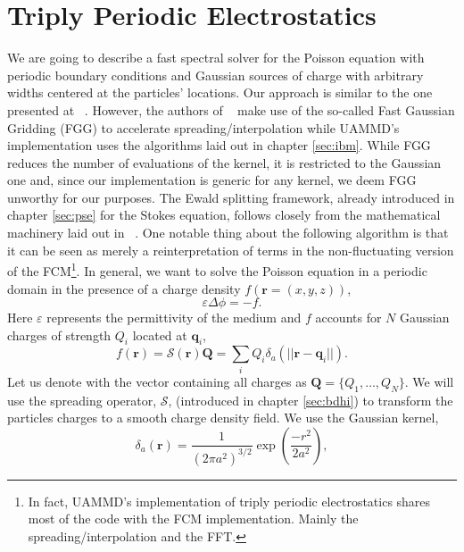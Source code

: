 \documentclass[twoside,openright,titlepage,numbers=noenddot,%
headinclude,footinclude,cleardoublepage=empty,abstract=on,
BCOR=5mm,fontsize=11pt, dvipsnames, paper=b5
]{scrreprt}
\renewcommand{\vec}[1]{\bm{#1}}
\newcommand{\oper}[1]{\mathcal{#1}}
\newcommand{\ppos}{q}
\newcommand{\fpos}{r}
\begin{document}
\chapter{Triply Periodic Electrostatics} \label{ch:tppoisson}

We are going to describe a fast spectral solver for the Poisson equation with periodic boundary conditions and Gaussian sources of charge with arbitrary widths centered at the particles' locations. Our approach is similar to the one presented at ~\cite{Lindbo2011}. However, the authors of ~\cite{Lindbo2011} make use of the so-called Fast Gaussian Gridding (FGG) to accelerate spreading/interpolation while UAMMD's implementation uses the algorithms laid out in chapter \ref{sec:ibm}. While FGG reduces the number of evaluations of the kernel, it is restricted to the Gaussian one and, since our implementation is generic for any kernel, we deem FGG unworthy for our purposes. The Ewald splitting framework, already introduced in chapter \ref{sec:pse} for the Stokes equation, follows closely from the mathematical machinery laid out in ~\cite{Tornberg2015}.
One notable thing about the following algorithm is that it can be seen as merely a reinterpretation of terms in the non-fluctuating version of the \gls{FCM}\footnote{In fact, UAMMD's implementation of triply periodic electrostatics shares most of the code with the \gls{FCM} implementation. Mainly the spreading/interpolation and the \gls{FFT}.}.
In general, we want to solve the Poisson equation in a periodic domain in the presence of a charge density $f(\vec{\fpos}=(x,y,z))$,
\begin{equation}
  \label{eq:ttpoisson}
 \varepsilon\Delta\phi=-f.
\end{equation}
Here $\varepsilon$ represents the permittivity of the medium and $f$ accounts for $N$ Gaussian charges of strength $Q_i$ located at $\vec{\ppos}_i$,
\begin{equation}
  \label{eq:tppoisson_cdens}
  f(\vec{\fpos})= \oper{S}(\vec{\fpos})\vec{Q} = \sum_iQ_i\delta_a(||\vec{\fpos}-\vec{\ppos}_i||).
\end{equation}
Let us denote with the vector containing all charges as $\vec{Q} = \{Q_1,\dots,Q_N\}$.
We will use the spreading operator, $\oper{S}$, (introduced in chapter \ref{sec:bdhi}) to transform the particles charges to a smooth charge density field. We use the Gaussian kernel,
\begin{equation}
  \label{eq:tpppoisson_gaussiansource}
  \delta_a(\vec{r})=\frac{1}{\left(2\pi a^2\right)^{3/2}}\exp{\left(\frac{-r^2}{2a^2}\right)},
\end{equation}
\end{document}
